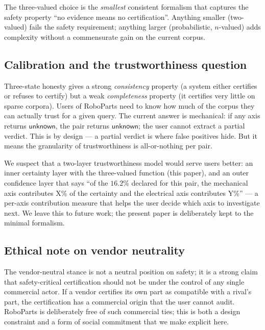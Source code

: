 \documentclass[11pt,twocolumn]{article}
\begin{document}
The three-valued choice is the \emph{smallest} consistent formalism
that captures the safety property ``no evidence means no
certification''. Anything smaller (two-valued) fails the safety
requirement; anything larger (probabilistic, $n$-valued) adds
complexity without a commensurate gain on the current corpus.

\subsection{Calibration and the trustworthiness question}

Three-state honesty gives a strong \emph{consistency} property
(a system either certifies or refuses to certify) but a weak
\emph{completeness} property (it certifies very little on sparse
corpora). Users of RoboParts need to know how much of the corpus
they can actually trust for a given query. The current answer is
mechanical: if any axis returns $\mathsf{unknown}$, the pair
returns $\mathsf{unknown}$; the user cannot extract a partial
verdict. This is by design — a partial verdict is where false
positives hide. But it means the granularity of trustworthiness
is all-or-nothing per pair.

We suspect that a two-layer trustworthiness model would serve
users better: an inner certainty layer with the three-valued
function (this paper), and an outer confidence layer that says
``of the $16.2\%$ declared for this pair, the mechanical axis
contributes X\% of the certainty and the electrical axis
contributes Y\%'' --- a per-axis contribution measure that helps
the user decide which axis to investigate next. We leave this to
future work; the present paper is deliberately kept to the
minimal formalism.

\subsection{Ethical note on vendor neutrality}

The vendor-neutral stance is not a neutral position on safety;
it is a strong claim that safety-critical certification should
not be under the control of any single commercial actor. If a
vendor certifies its own part as compatible with a rival's part,
the certification has a commercial origin that the user cannot
audit. RoboParts is deliberately free of such commercial ties;
this is both a design constraint and a form of social commitment
that we make explicit here.

\end{document}
